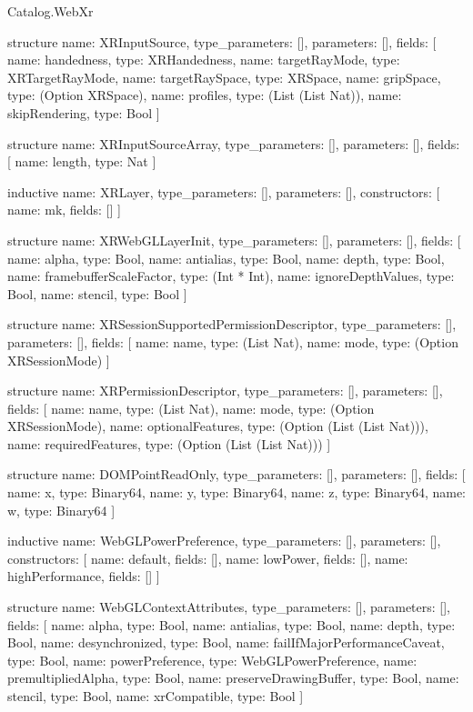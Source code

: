 \begin{lexlean}{Catalog.WebXr}
\begin{semanticmodule}
structure{
  name: XRInputSource,
  type_parameters: [],
  parameters: [],
  fields: [
    {name: handedness, type: XRHandedness},
    {name: targetRayMode, type: XRTargetRayMode},
    {name: targetRaySpace, type: XRSpace},
    {name: gripSpace, type: (Option XRSpace)},
    {name: profiles, type: (List (List Nat))},
    {name: skipRendering, type: Bool}
  ]
}

structure{
  name: XRInputSourceArray,
  type_parameters: [],
  parameters: [],
  fields: [
    {name: length, type: Nat}
  ]
}

inductive{
  name: XRLayer,
  type_parameters: [],
  parameters: [],
  constructors: [
    {name: mk, fields: []}
  ]
}

structure{
  name: XRWebGLLayerInit,
  type_parameters: [],
  parameters: [],
  fields: [
    {name: alpha, type: Bool},
    {name: antialias, type: Bool},
    {name: depth, type: Bool},
    {name: framebufferScaleFactor, type: (Int * Int)},
    {name: ignoreDepthValues, type: Bool},
    {name: stencil, type: Bool}
  ]
}

structure{
  name: XRSessionSupportedPermissionDescriptor,
  type_parameters: [],
  parameters: [],
  fields: [
    {name: name, type: (List Nat)},
    {name: mode, type: (Option XRSessionMode)}
  ]
}

structure{
  name: XRPermissionDescriptor,
  type_parameters: [],
  parameters: [],
  fields: [
    {name: name, type: (List Nat)},
    {name: mode, type: (Option XRSessionMode)},
    {name: optionalFeatures, type: (Option (List (List Nat)))},
    {name: requiredFeatures, type: (Option (List (List Nat)))}
  ]
}

structure{
  name: DOMPointReadOnly,
  type_parameters: [],
  parameters: [],
  fields: [
    {name: x, type: Binary64},
    {name: y, type: Binary64},
    {name: z, type: Binary64},
    {name: w, type: Binary64}
  ]
}

inductive{
  name: WebGLPowerPreference,
  type_parameters: [],
  parameters: [],
  constructors: [
    {name: default, fields: []},
    {name: lowPower, fields: []},
    {name: highPerformance, fields: []}
  ]
}

structure{
  name: WebGLContextAttributes,
  type_parameters: [],
  parameters: [],
  fields: [
    {name: alpha, type: Bool},
    {name: antialias, type: Bool},
    {name: depth, type: Bool},
    {name: desynchronized, type: Bool},
    {name: failIfMajorPerformanceCaveat, type: Bool},
    {name: powerPreference, type: WebGLPowerPreference},
    {name: premultipliedAlpha, type: Bool},
    {name: preserveDrawingBuffer, type: Bool},
    {name: stencil, type: Bool},
    {name: xrCompatible, type: Bool}
  ]
}


\end{semanticmodule}
\end{lexlean}
